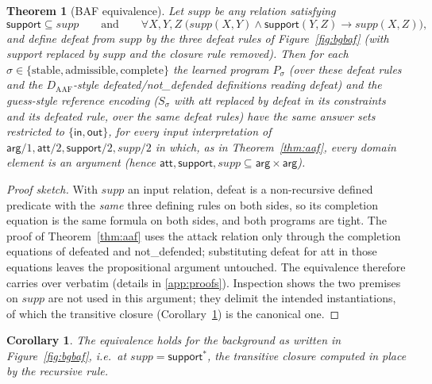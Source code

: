 \documentclass[review,12pt]{elsarticle}
\newtheorem{theorem}{Theorem}
\newtheorem{corollary}{Corollary}
\theoremstyle{definition}
\theoremstyle{remark}
\newcommand{\pred}[1]{\textsf{#1}}
\newcommand{\Daaf}{D_{\mathrm{AAF}}}
\begin{document}
\begin{theorem}[BAF equivalence]
\label{thm:baf}
Let $\mathit{supp}$ be \emph{any} relation satisfying
\[
\pred{support}\subseteq\mathit{supp}
\qquad\text{and}\qquad
\forall X,Y,Z\;\bigl(\mathit{supp}(X,Y)\wedge\pred{support}(Y,Z)\rightarrow
\mathit{supp}(X,Z)\bigr),
\]
and define defeat from $\mathit{supp}$ by the three defeat rules of
Figure~\ref{fig:bgbaf} (with \pred{support} replaced by $\mathit{supp}$ and the
closure rule removed). Then for each
$\sigma\in\{\text{stable},\text{admissible},\text{complete}\}$ the learned
program $P_\sigma$ (over these defeat rules and the $\Daaf$-style
\pred{defeated}/\pred{not\_defended} definitions reading \pred{defeat}) and
the guess-style reference encoding ($S_\sigma$ with \pred{att} replaced by
\pred{defeat} in its constraints and its \pred{defeated} rule, over the same
defeat rules) have the same answer sets restricted to
$\{\pred{in},\pred{out}\}$, for every input interpretation of
$\pred{arg}/1,\pred{att}/2,\pred{support}/2,\mathit{supp}/2$ in which, as in
Theorem~\ref{thm:aaf}, every domain element is an argument (hence
$\pred{att},\pred{support},\mathit{supp}\subseteq
\pred{arg}\times\pred{arg}$).
\end{theorem}

\begin{proof}[Proof sketch]
With $\mathit{supp}$ an input relation, \pred{defeat} is a non-recursive
defined predicate with the \emph{same} three defining rules on both sides, so
its completion equation is the same formula on both sides, and both programs
are tight. The proof of Theorem~\ref{thm:aaf} uses the attack relation only
through the completion equations of \pred{defeated} and \pred{not\_defended};
substituting \pred{defeat} for \pred{att} in those equations leaves the
propositional argument untouched. The equivalence therefore carries over
verbatim (details in \ref{app:proofs}). Inspection shows the two premises on
$\mathit{supp}$ are not used in this argument; they delimit the intended
instantiations, of which the transitive closure
(Corollary~\ref{cor:closure}) is the canonical one.
\end{proof}

\begin{corollary}
\label{cor:closure}
The equivalence holds for the background as written in
Figure~\ref{fig:bgbaf}, i.e.\ at $\mathit{supp}=\pred{support}^{*}$, the
transitive closure computed in place by the recursive rule.
\end{corollary}
\end{document}
